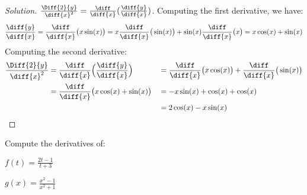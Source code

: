 \documentclass[crop=false,class=book,oneside]{standalone}                      %
\begin{document}
            \begin{proof}[Solution]
                $\frac{\Diff{2}{y}}{\diff{x}^{2}}%
                 =\frac{\diff}{\diff{x}}(\frac{\diff{y}}{\diff{x}})$.
                Computing the first derivative, we have:
                \begin{equation*}
                    \frac{\diff{y}}{\diff{x}}
                    =\frac{\diff}{\diff{x}}
                        \big(x\sin(x)\big)
                    =x\frac{\diff}{\diff{x}}
                        \big(\sin(x)\big)+
                        \sin(x)\frac{\diff}{\diff{x}}
                        \big(x\big)
                    =x\cos(x)+\sin(x)    
                \end{equation*}
                Computing the second derivative:
                \begin{align*}
                    \frac{\Diff{2}{y}}{\diff{x}^{2}}
                    &=\frac{\diff}{\diff{x}}
                        \Big(\frac{\diff{y}}{\diff{x}}\Big)
                    &
                    &=\frac{\diff}{\diff{x}}
                        \big(x\cos(x)\big)+
                        \frac{\diff}{\diff{x}}
                        \big(\sin(x)\big)\\
                    &=\frac{\diff}{\diff{x}}
                        \big(x\cos(x)+\sin(x)\big)
                    &
                    &=-x\sin(x)+\cos(x)+\cos(x)\\
                    &&
                    &=2\cos(x)-x\sin(x)
                \end{align*}
            \end{proof}
            \begin{problem}
                Compute the derivatives of:
                \begin{enumerate}[label=(\alph*)]
                    \begin{multicols}{2}
                        \item $f(t)=\frac{2t-1}{t+3}$
                        \item $g(x)=\frac{x^{2}-1}{x^{2}+1}$
                    \end{multicols}
                \end{enumerate}
            \end{problem}
\end{document}
